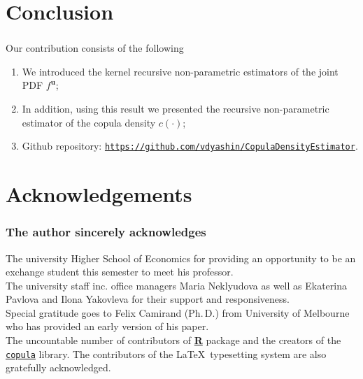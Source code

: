 \documentclass[aspectratio=169]{beamer}
\begin{document}
\section{Conclusion}
	\begin{frame}
		\frametitle{\insertsection}
		
		Our contribution consists of the following
		\begin{enumerate}
			\item<1-> We introduced the kernel recursive non-parametric estimators of the joint PDF $ f^\mathbf{u} $;
			\item<2-> In addition, using this result we presented the recursive non-parametric estimator of the copula density $ c(\cdot) $;
			\item<3-> Github repository: \href{https://github.com/vdyashin/CopulaDensityEstimator}{\texttt{https://github.com/vdyashin/CopulaDensityEstimator}}.
		\end{enumerate}
		
	\end{frame}
	
\section{Acknowledgements}
	\begin{frame}
		\frametitle{The author sincerely acknowledges}
		
		The university Higher School of Economics for providing an opportunity to be an exchange student this semester to meet his professor. \\[1em]
		
		The university staff inc. office managers Maria Neklyudova as well as Ekaterina Pavlova and Ilona Yakovleva for their support and responsiveness. \\[1em]
		
		Special gratitude goes to Felix Camirand (Ph.\,D.) from University of Melbourne who has provided an early version of his paper.\\[1em]
		
		The uncountable number of contributors of \href{https://R-project.org/}{\textbf{R}} package and the creators of the \href{https://cran.r-project.org/web/packages/copula/copula.pdf}{\texttt{copula}} library. The contributors of the \LaTeX~typesetting system are also gratefully acknowledged. 
		
	\end{frame}
			
\section{}
	\maketitle
	~\\[-1em]
	\printbibliography
	
\end{document}
